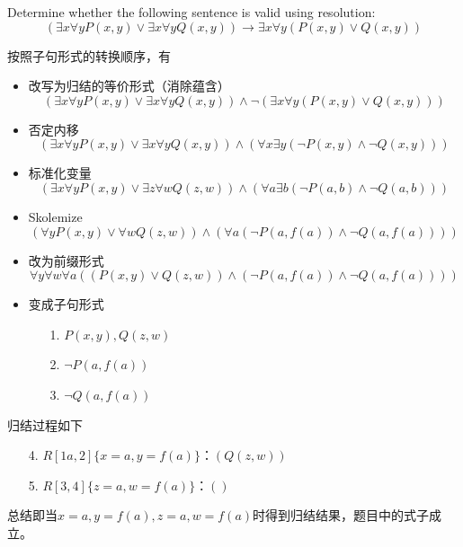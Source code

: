 \documentclass[a4paper, 11pt]{article}
\begin{document}
\begin{question}\normalfont
    Determine whether the following sentence is valid using resolution:
    \[(\exists x\forall y P(x,y)\lor\exists x\forall y Q(x,y))\to
    \exists x\forall y(P(x,y)\lor Q(x,y))\]
\end{question}
\begin{answer}
    按照子句形式的转换顺序，有
    \begin{itemize}
        \item 改写为归结的等价形式（消除蕴含）
        \[(\exists x\forall y P(x,y)\lor\exists x\forall y Q(x,y))\land\lnot
        (\exists x\forall y(P(x,y)\lor Q(x,y)))\]
        \item 否定内移
        \[(\exists x\forall y P(x,y)\lor\exists x\forall y Q(x,y))\land
        (\forall x\exists y (\lnot P(x,y)\land \lnot Q(x,y)))\]
        \item 标准化变量
        \[(\exists x\forall y P(x,y)\lor\exists z\forall w Q(z,w))\land
        (\forall a\exists b (\lnot P(a,b)\land \lnot Q(a,b)))\]
        \item Skolemize
        \[(\forall y P(x,y)\lor \forall w Q(z,w))\land
        (\forall a (\lnot P(a,f(a))\land \lnot Q(a,f(a))))\]
        \item 改为前缀形式
        \[\forall y\forall w\forall a ((P(x,y)\lor Q(z,w))\land
        (\lnot P(a,f(a))\land \lnot Q(a,f(a))))\]
        \item 变成子句形式
        \begin{itemize}
            \item [1.] $P(x,y),Q(z,w)$
            \item [2.] $\lnot P(a,f(a))$
            \item [3.] $\lnot Q(a,f(a))$
        \end{itemize}
    \end{itemize}
    归结过程如下
    \begin{enumerate}
        \item [4.] $R[1a,2]\{x=a,y=f(a)\}$：$(Q(z,w))$
        \item [5.] $R[3,4]\{z=a,w=f(a)\}$：$()$
    \end{enumerate}
    总结即当$x=a,y=f(a),z=a,w=f(a)$时得到归结结果，题目中的式子成立。
\end{answer}
\end{document}
